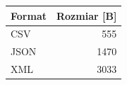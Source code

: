 \begin{tabular}{lr}
\toprule
Format & Rozmiar [B] \\
\midrule
CSV & 555 \\
JSON & 1470 \\
XML & 3033 \\
\bottomrule
\end{tabular}
